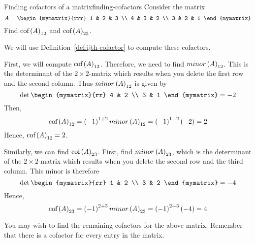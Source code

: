 \begin{example}{Finding cofactors of a matrix}{finding-cofactors}
Consider the matrix
\begin{equation*}
A=\begin{mymatrix}{rrr}
1 & 2 & 3 \\
4 & 3 & 2 \\
3 & 2 & 1
\end{mymatrix} 
\end{equation*}
Find $\mbox{\rm cof}\left(A\right) _{12}$ and $\mbox{\rm cof}\left(A\right) _{23}$.
\end{example}

\begin{solution} We will use Definition~\ref{def:ijth-cofactor} to compute these cofactors. 

First, we will compute $\mbox{\rm cof}\left(A\right) _{12}$. 
Therefore, we need to find $minor\left(A\right)_{12}$. This is the determinant of the $2\times 2$-matrix
which results when you delete the first row and the second column. Thus $minor\left(A\right)_{12}$ is given by 
\begin{equation*}
\det \begin{mymatrix}{rr}
4 & 2 \\
3 & 1
\end{mymatrix} = -2
\end{equation*}
Then,
\begin{equation*}
\mbox{\rm cof}\left(A\right) _{12}=\left(-1\right) ^{1+2} minor\left(A\right)_{12} =\left(-1\right) ^{1+2}\left(-2\right) =2
\end{equation*}
Hence, $\mbox{\rm cof}\left(A\right) _{12}=2$.

Similarly, we can find $\mbox{\rm cof}\left(A\right) _{23}$. First, find $minor\left(A\right)_{23}$, which is the determinant of the $2\times 2$-matrix
which results when you delete the second row and the third column. This
minor is therefore
\begin{equation*}
\det \begin{mymatrix}{rr}
1 & 2 \\
3 & 2
\end{mymatrix} = -4
\end{equation*}
Hence,
\begin{equation*}
\mbox{\rm cof}\left(A\right) _{23}=\left(-1\right) ^{2+3} minor\left(A\right)_{23} =\left(-1\right) ^{2+3}\left(-4\right) =4
\end{equation*}
\end{solution}

You may wish to find the remaining cofactors for the above matrix. Remember that there is a cofactor 
for every entry in the matrix.  

